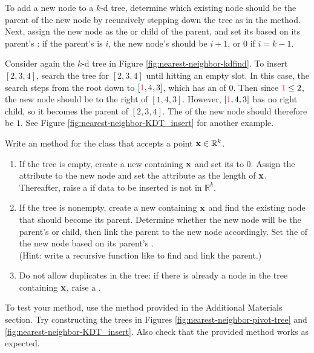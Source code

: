 To add a new node to a $k$-d tree, determine which existing node should be the parent of the new node by recursively stepping down the tree as in the  method.
Next, assign the new node as the  or  child of the parent, and set its  based on its parent's : if the parent's  is $i$, the new node's  should be $i+1$, or $0$ if $i = k-1$.

Consider again the $k$-d tree in Figure \ref{fig:nearest-neighbor-kdfind}.
To insert $[2,3,4]$, search the tree for $[2,3,4]$ until hitting an empty slot.
In this case, the search steps from the root down to $[\textcolor{red}{1},4,3]$, which has an  of $0$.
Then since $\textcolor{red}{1} \le 2$, the new node should be to the right of $[1,4,3]$.
However, $[\textcolor{red}{1},4,3]$ has no right child, so it becomes the parent of $[2,3,4]$.
The  of the new node should therefore be $1$.
See Figure \ref{fig:nearest-neighbor-KDT_insert} for another example.

\begin{problem} %
\label{prob:kdt-insert}
Write an  method for the  class that accepts a point $\mathbf{x}\in\mathbb{R}^k$.
\begin{enumerate}
\item If the tree is empty, create a new  containing $\mathbf{x}$ and set its  to $0$.
Assign the  attribute to the new node and set the  attribute as the length of $\mathbf{x}$.
Thereafter, raise a  if data to be inserted is not in $\mathbb{R}^k$.
\item If the tree is nonempty, create a new  containing $\mathbf{x}$ and find the existing node that should become its parent.
Determine whether the new node will be the parent's  or  child, then link the parent to the new node accordingly.
Set the  of the new node based on its parent's .
\\(Hint: write a recursive function like  to find and link the parent.)
\item Do not allow duplicates in the tree: if there is already a node in the tree containing $\mathbf{x}$, raise a .
\end{enumerate}
To test your method, use the  method provided in the Additional Materials section.
Try constructing the trees in Figures \ref{fig:nearest-neighbor-pivot-tree} and \ref{fig:nearest-neighbor-KDT_insert}.
Also check that the provided  method works as expected.
\end{problem}

